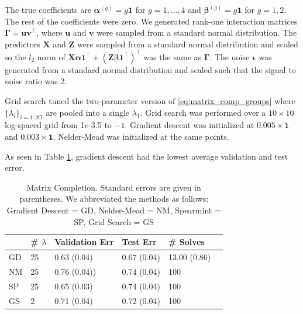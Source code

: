 \documentclass[12pt]{article}
\begin{document}
The true coefficients are $\boldsymbol{\alpha}^{(g)} = g \boldsymbol{1}$ for $g = 1,...,4$ and $\boldsymbol{\beta}^{(g)} = g \boldsymbol{1}$ for $g = 1,2$. The rest of the coefficients were zero. We generated rank-one interaction matrices $\boldsymbol{\Gamma} = \boldsymbol{u}\boldsymbol{v}^\top$, where $\boldsymbol{u}$ and $\boldsymbol{v}$ were sampled from a standard normal distribution. The predictors $\boldsymbol X$ and $\boldsymbol{Z}$ were sampled from a standard normal distribution and scaled so the $l_2$ norm of $\boldsymbol{X}\boldsymbol{\alpha}\boldsymbol{1}^\top + (\boldsymbol{Z}\boldsymbol{\beta}\boldsymbol{1}^\top)^\top$ was the same as $\boldsymbol{\Gamma}$.
The noise $\boldsymbol \epsilon$ was generated from a standard normal distribution and scaled such that the signal to noise ratio was 2. 


Grid search tuned the two-parameter version of \eqref{eq:matrix_comp_groups} where $\{\lambda_i\}_{i=1:2G}$ are pooled into a single $\lambda_1$. Grid search was performed over a $10 \times 10$ log-spaced grid from 1$e$-3.5 to $-1$. Gradient descent was initialized at $0.005 \times \boldsymbol 1$ and $0.003 \times \boldsymbol 1$. Nelder-Mead was initialized at the same points.

As seen in Table \ref{table:matrix_completion}, gradient descent had the lowest average validation and test error.

\begin{table}
	\caption{\label{table:matrix_completion} Matrix Completion. Standard errors are given in parentheses. We abbreviated the methods as follows: Gradient Descent = GD, Nelder-Mead = NM, Spearmint = SP, Grid Search = GS}
	\centering
		\begin{tabular}{| l | l | l | l | l | l | }
		\hline
		& \# $\lambda$ & Validation Err & Test Err & \# Solves\\
		\hline
		GD & 25 & 0.63 (0.04) & 0.67 (0.04) & 13.00 (0.86)\\
		\hline
		NM & 25 & 0.76 (0.04)) & 0.74 (0.04) & 100 \\
		\hline
		SP & 25 & 0.65 (0.03) & 0.74 (0.04) & 100\\
		\hline
		GS & 2 & 0.71 (0.04) & 0.72 (0.04) & 100\\
		\hline
	\end{tabular}
\end{table}
\end{document}
